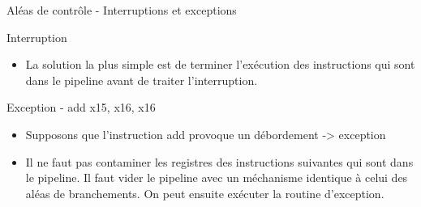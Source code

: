 %
\begin{Frame}{Aléas de contrôle - Interruptions et exceptions}

\begin{block}{Interruption}
       \begin{center}
 	\begin{itemize}
          \item La solution la plus simple est de terminer l'exécution des instructions qui sont dans le pipeline avant de traiter l'interruption.
        \end{itemize}
       \end{center}
      \end{block}   

 

\begin{block}{Exception - add x15, x16, x16}
       \begin{center}
 	\begin{itemize}
         \item Supposons que l'instruction add provoque un débordement -> exception
	 \item Il ne faut pas contaminer les registres des instructions suivantes qui sont dans le pipeline. Il faut vider le pipeline avec un méchanisme identique à celui des aléas de branchements. On peut ensuite exécuter la routine d'exception.
	
        \end{itemize}
       \end{center}
      \end{block}   

\end{Frame}


